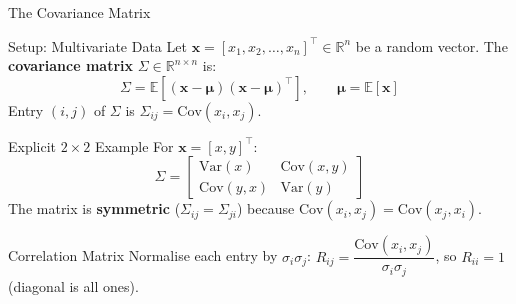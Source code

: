 \documentclass{beamer}
\begin{document}
\begin{frame}[shrink=10]{The Covariance Matrix}
  \begin{block}{Setup: Multivariate Data}
    Let $\mathbf{x} = [x_1, x_2, \ldots, x_n]^\top \in \mathbb{R}^n$
    be a random vector.
    The \textbf{covariance matrix} $\Sigma \in \mathbb{R}^{n \times n}$ is:
    \[
      \Sigma = \mathbb{E}\!\left[
        (\mathbf{x}-\boldsymbol{\mu})(\mathbf{x}-\boldsymbol{\mu})^\top
      \right],
      \qquad
      \boldsymbol{\mu} = \mathbb{E}[\mathbf{x}]
    \]
    Entry $(i,j)$ of $\Sigma$ is $\Sigma_{ij} = \mathrm{Cov}(x_i, x_j)$.
  \end{block}

  \medskip

  \begin{block}{Explicit $2\times2$ Example}
    For $\mathbf{x} = [x, y]^\top$:
    \[
      \Sigma
        = \begin{bmatrix}
            \mathrm{Var}(x)   & \mathrm{Cov}(x,y)\\
            \mathrm{Cov}(y,x) & \mathrm{Var}(y)
          \end{bmatrix}
    \]
    The matrix is \textbf{symmetric} ($\Sigma_{ij} = \Sigma_{ji}$) because
    $\mathrm{Cov}(x_i,x_j) = \mathrm{Cov}(x_j,x_i)$.
  \end{block}

  \medskip

  \begin{block}{Correlation Matrix}
    Normalise each entry by $\sigma_i\sigma_j$:
    $R_{ij} = \dfrac{\mathrm{Cov}(x_i,x_j)}{\sigma_i\sigma_j}$,\quad
    so $R_{ii} = 1$ (diagonal is all ones).
  \end{block}
\end{frame}
\end{document}
